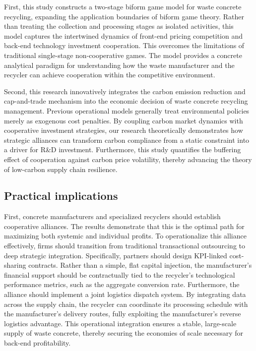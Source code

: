 \documentclass[authoryear,preprint,review,times,10pt]{elsarticle}
\begin{document}
First, this study constructs a two-stage biform game model for waste concrete recycling, expanding the application boundaries of biform game theory. Rather than treating the collection and processing stages as isolated activities, this model captures the intertwined dynamics of front-end pricing competition and back-end technology investment cooperation. This overcomes the limitations of traditional single-stage non-cooperative games. The model provides a concrete analytical paradigm for understanding how the waste manufacturer and the recycler can achieve cooperation within the competitive environment.

Second, this research innovatively integrates the carbon emission reduction and cap-and-trade mechanism into the economic decision of waste concrete recycling management. Previous operational models generally treat environmental policies merely as exogenous cost penalties. By coupling carbon market dynamics with cooperative investment strategies, our research theoretically demonstrates how strategic alliances can transform carbon compliance from a static constraint into a driver for R\&D investment. Furthermore, this study quantifies the buffering effect of cooperation against carbon price volatility, thereby advancing the theory of low-carbon supply chain resilience.

\subsection{Practical implications}

First, concrete manufacturers and specialized recyclers should establish cooperative alliances. The results demonstrate that this is the optimal path for maximizing both systemic and individual profits. To operationalize this alliance effectively, firms should transition from traditional transactional outsourcing to deep strategic integration. Specifically, partners should design KPI-linked cost-sharing contracts. Rather than a simple, flat capital injection, the manufacturer's financial support should be contractually tied to the recycler's technological performance metrics, such as the aggregate conversion rate. Furthermore, the alliance should implement a joint logistics dispatch system. By integrating data across the supply chain, the recycler can coordinate its processing schedule with the manufacturer's delivery routes, fully exploiting the manufacturer's reverse logistics advantage. This operational integration ensures a stable, large-scale supply of waste concrete, thereby securing the economies of scale necessary for back-end profitability.
\end{document}
